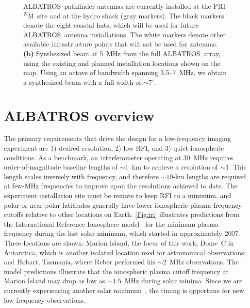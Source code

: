 \documentclass{ws-jai}
\def\albatros{ALBATROS}
\def\prizm{PRI$^{\rm Z}$M}
\begin{document}
\begin{figure}
{      \albatros\ pathfinder antennas are currently installed at the
      \prizm\ site and at the hydro shack (gray markers).  The black
      markers denote the eight coastal huts, which will be used for
      future \albatros\ antenna installations.  The white markers
      denote other available infrastructure points that will not be
      used for antennas.  {\bf (b)} Synthesized beam at 5~MHz from the
      full \albatros\ array, using the existing and planned
      installation locations shown on the map.  Using an octave of
      bandwidth spanning 3.5--7~MHz, we obtain a synthesized beam with
      a full width of $\sim7'$.}\label{Fig:marion_map_beam}
\end{figure}

\section{ALBATROS overview}


The primary requirements that drive the design for a low-frequency
imaging experiment are 1) desired resolution, 2) low RFI, and 3) quiet
ionospheric conditions.  As a benchmark, an interferometer operating
at 30~MHz requires order-of-magnitude baseline lengths of $\sim 1$~km
to achieve a resolution of $\sim 1$\degree.  This length scales
inversely with frequency, and therefore $\sim 10$-km lengths are
required at few-MHz frequencies to improve upon the resolutions
achieved to date.  The experiment installation site must be remote to
keep RFI to a minimum, and polar or near-polar latitiudes generally
have lower ionospheric plasma frequency cutoffs relative to other
locations on Earth.  \autoref{Fig:iri} illustrates predictions from
the International Reference Ionosphere
model~\citep{2018AdRS...16....1B} for the minimum plasma frequency
during the last solar minimum, which started in approximately 2007.
Three locations are shown: Marion Island, the focus of this work;
Dome~C in Antarctica, which is another isolated location used for
astronomical observations; and Hobart, Tasmania, where Reber performed
his $\sim2$~MHz observations.  The model predictions illustrate that
the ionospheric plasma cutoff frequency at Marion Island may drop as
low as $\sim1.5$~MHz during solar minima.  Since we are currently
experiencing another solar minimum~\citep{2018NatCo...9.5209B}, the
timing is opportune for new low-frequency observations.
\end{document}
